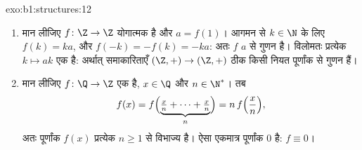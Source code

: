 \begin{solution}{exo:b1:structures:12}
\begin{enumerate}
  \item मान लीजिए $f \colon \Z \to \Z$ योगात्मक है और $a = f(1)$। आगमन से $k
  \in \N$ के लिए $f(k) = ka$, और $f(-k) = -f(k) = -ka$: अतः $f$ $a$ से गुणन
  है। विलोमतः प्रत्येक  $k \mapsto ak$ एक  है: अर्थात्
  समाकारिताएँ $(\Z,+) \to (\Z,+)$ ठीक किसी नियत पूर्णांक से गुणन हैं।
  \item मान लीजिए $f \colon \Q \to \Z$ एक  है, $x \in \Q$ और $n \in
  \N^*$। तब
        \[
        f(x) = f\Bigl(\underbrace{\tfrac xn + \dots +
        \tfrac xn}_{n}\Bigr) = n\,f\Bigl(\frac xn\Bigr) ,
        \]
        अतः पूर्णांक $f(x)$ प्रत्येक $n \geq 1$ से विभाज्य है। ऐसा एकमात्र
        पूर्णांक $0$ है: $f \equiv 0$।
\end{enumerate}
\end{solution}

